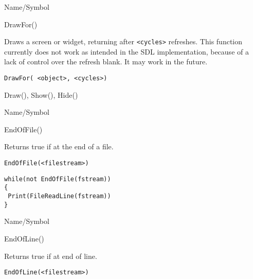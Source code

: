 \rl



\begin{desc}{Name/Symbol}
\item[Name/Symbol]	DrawFor()

\item[Description]  	Draws a screen or widget, returning after \verb+<cycles>+ refreshes. This function currently does not work as intended in the SDL implementation, because of a lack of control over the
		refresh blank.  It may work in the future.

\item[Usage]
\begin{verbatim}
DrawFor( <object>, <cycles>)
\end{verbatim}

\item[Example]	

\item[See Also]	Draw(), Show(), Hide()
\end{desc}

\rl




\begin{desc}{Name/Symbol}
\item[Name/Symbol]	EndOfFile()

\item[Description]	Returns true if at the end of a file.

\item[Usage]
\begin{verbatim}
EndOfFile(<filestream>)
\end{verbatim}

\item[Example]
\begin{verbatim}
while(not EndOfFile(fstream))
{
 Print(FileReadLine(fstream))
}
\end{verbatim}

\item[See Also]	
\end{desc}

\rl



\begin{desc}{Name/Symbol}
\item[Name/Symbol]	EndOfLine()

\item[Description]	Returns true if at end of line.

\item[Usage]
\begin{verbatim}
EndOfLine(<filestream>)
\end{verbatim}

\item[Example]	

\item[See Also]	
\end{desc}

